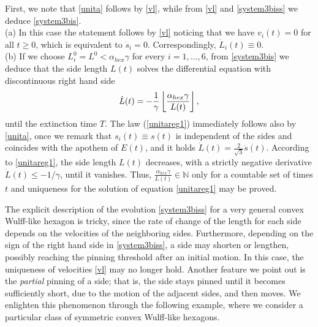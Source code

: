 \documentclass{interact}
\numberwithin{equation}{section}
\theoremstyle{definition}
\begin{document}
\proof
First, we note that \eqref{unita} follows by \eqref{vl}, while from \eqref{vl} and \eqref{system3biss} we deduce \eqref{system3bis}.\\
\noindent
(a) In this case the statement follows by \eqref{vl} noticing that we have $v_{i}(t)=0$ for all $t\geq0$, which is equivalent to $\dot{s}_i=0$. Correspondingly, $\dot{L}_i(t)\equiv0$. \\
(b) If we choose $L_i^0=L^0<\alpha_{hex}\gamma$ for every $i=1,\dots,6$, from \eqref{system3bis} we deduce that the side length $L(t)$ solves the differential equation with discontinuous right hand side
\begin{equation}\label{unitareg1}
\dot{L}(t)=-{1\over \gamma}\left\lfloor\frac{\alpha_{hex}\gamma}{L(t)}\right\rfloor,
\end{equation}
until the extinction time $T$. The law (\ref{unitareg1}) immediately follows also by \eqref{unita}, once we remark that $s_i(t)\equiv s(t)$ is independent of the sides and coincides with the apothem of $E(t)$, and it holds $\dot{L}(t)=\frac{2}{\sqrt{3}}\dot{s}(t)$. 
According to \eqref{unitareg1}, the side length $L(t)$ decreases, with a strictly negative derivative $\dot{L}(t)\leq-1/\gamma$, until it vanishes. Thus, $\frac{\alpha_{hex}\gamma}{L(t)}\in\mathbb{N}$ only for a countable set of times $t$ and uniqueness for the solution of equation \eqref{unitareg1} may be proved.

\endproof

The explicit description of the evolution \eqref{system3biss} for a very general convex Wulff-like hexagon is tricky, since the rate of change of the length for each side depends on the velocities of the neighboring sides. Furthermore, depending on the sign of the right hand side in \eqref{system3biss}, a side may shorten or lengthen, possibly reaching the pinning threshold after an initial motion. In this case, the uniqueness of velocities \eqref{vl} may no longer hold. Another feature we point out is the \emph{partial} pinning of a side; that is, the side stays pinned until it becomes sufficiently short, due to the motion of the adjacent sides, and then moves. We enlighten this phenomenon through the following example, where we consider a particular class of symmetric convex Wulff-like hexagons. 
\end{document}
